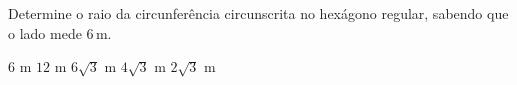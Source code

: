 \noindent\parbox{\linewidth}{

Determine o raio da circunferência circunscrita no hexágono regular, sabendo que o lado mede $6$\,m.

$6$ m
$12$ m
$6\sqrt{3}$ m
$4\sqrt{3}$ m
$2\sqrt{3}$ m



}


